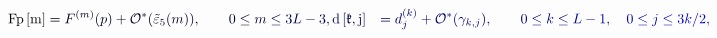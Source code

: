 \documentclass[12pt]{article}
\begin{document}
\makeatletter
\renewcommand*{\@textcolor}[3]{%
  \protect\leavevmode
  \begingroup
    \color#1{#2}#3%
  \endgroup
}
\makeatother
\begin{displaymath}
\begin{align*}\begin{split}\mathrm{Fp}\left[\mathrm{m}\right] \mathcolor[RGB]{0,0,15}{&=} \mathcolor[RGB]{0,0,30}{F^{(m)}(p)+\mathcal{O}^*(\tilde{\varepsilon}_5(m)),} \qquad \mathcolor[RGB]{0,0,45}{0\leq} \mathcolor[RGB]{0,0,60}{m\leq} \mathcolor[RGB]{0,0,75}{3L-3,\mathrm{d}\left[\mathfrak{k},\mathrm{j}\right]} \mathcolor[RGB]{0,0,90}{&=} \mathcolor[RGB]{0,0,105}{d_j^{(k)}+\mathcal{O}^*(\gamma_{k,j}),} \qquad \mathcolor[RGB]{0,0,120}{0\leq} \mathcolor[RGB]{0,0,135}{k\leq} \mathcolor[RGB]{0,0,150}{L-1,} \quad \mathcolor[RGB]{0,0,165}{0\leq} \mathcolor[RGB]{0,0,180}{j\leq} \mathcolor[RGB]{0,0,195}{3k/2,\end{split}\end{align*}}
\end{displaymath}
\end{document}
